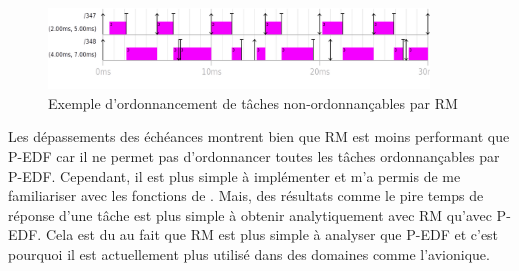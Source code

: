 \begin{figure}[H]
    \centering
    \includegraphics[width=0.9\textwidth]{Images/RM_rMerde.png}
    \caption{Exemple d'ordonnancement de tâches non-ordonnançables par RM}
\end{figure}

Les dépassements des échéances montrent bien que RM est moins performant que P-EDF car il ne permet pas d'ordonnancer toutes les tâches ordonnançables par P-EDF. Cependant, il est plus simple à implémenter et m'a permis de me familiariser avec les fonctions de \litmus. Mais, des résultats comme le pire temps de réponse d'une tâche est plus simple à obtenir analytiquement avec RM qu'avec P-EDF. Cela est du au fait que RM est plus simple à analyser que P-EDF et c'est pourquoi il est actuellement plus utilisé dans des domaines comme l'avionique.
